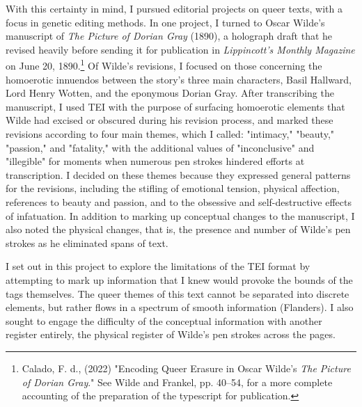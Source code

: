 \documentclass[11pt]{article}
\begin{document}
With this certainty in mind, I pursued editorial projects on queer
texts, with a focus in genetic editing methods. In one project, I
turned to Oscar Wilde's manuscript of \emph{The Picture of Dorian Gray}
(1890), a holograph draft that he revised heavily before sending it
for publication in \emph{Lippincott's Monthly Magazine} on June 20,
1890.\footnote{Calado, F. d., (2022) "Encoding Queer Erasure in Oscar Wilde’s
\emph{The Picture of Dorian Gray}." See Wilde and Frankel, pp. 40--54, for
a more complete accounting of the preparation of the typescript for
publication.} Of Wilde's revisions, I focused on those concerning the
homoerotic innuendos between the story's three main characters, Basil
Hallward, Lord Henry Wotten, and the eponymous Dorian Gray. After
transcribing the manuscript, I used TEI with the purpose of surfacing
homoerotic elements that Wilde had excised or obscured during his
revision process, and marked these revisions according to four main
themes, which I called: "intimacy," "beauty," "passion," and
"fatality," with the additional values of "inconclusive" and
"illegible" for moments when numerous pen strokes hindered efforts at
transcription. I decided on these themes because they expressed
general patterns for the revisions, including the stifling of
emotional tension, physical affection, references to beauty and
passion, and to the obsessive and self-destructive effects of
infatuation. In addition to marking up conceptual changes to the
manuscript, I also noted the physical changes, that is, the presence
and number of Wilde's pen strokes as he eliminated spans of text.  

I set out in this project to explore the limitations of the TEI format
by attempting to mark up information that I knew would provoke the
bounds of the tags themselves. The queer themes of this text cannot be
separated into discrete elements, but rather flows in a spectrum of
smooth information (Flanders). I also sought to engage the difficulty
of the conceptual information with another register entirely, the
physical register of Wilde's pen strokes across the pages.
\end{document}
